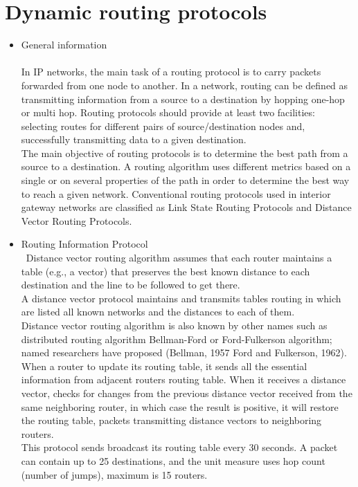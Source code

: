\documentclass[conference,compsoc]{IEEEtran}
\begin{document}
\section{Dynamic routing protocols}
\begin{itemize}
\item 
General information\\\\
In IP networks, the main task of a routing protocol is to carry packets forwarded from one node to another. In a network, routing can be defined as transmitting information from a source to a destination by hopping one-hop or multi hop. Routing protocols should provide at least two facilities: selecting routes for different pairs of source/destination nodes and, successfully transmitting data to a given destination.
\\ The main objective of routing protocols is to determine the best path from a source to a destination. A routing algorithm uses different metrics based on a single or on several properties of the path in order to determine the best way to reach a given network. Conventional routing protocols used in interior gateway networks are classified as Link State Routing Protocols and Distance Vector Routing Protocols.

\item
Routing Information Protocol\\\
Distance vector routing algorithm assumes that each router maintains a table (e.g., a vector) that preserves the best known distance to each destination and the line to be followed to get there.
\\ A distance vector protocol maintains and transmits tables routing in which are listed all known networks and the distances to each of them.
\\ Distance vector routing algorithm is also known by other names such as distributed routing algorithm Bellman-Ford or Ford-Fulkerson algorithm; named researchers have proposed (Bellman, 1957 Ford and Fulkerson, 1962). When a router to update its routing table, it sends all the essential information from adjacent routers routing table. When it receives a distance vector, checks for changes from the previous distance vector received from the same neighboring router, in which case the result is positive, it will restore the routing table, packets transmitting distance vectors to neighboring routers.
\\ This protocol sends broadcast its routing table every 30 seconds. A packet can contain up to 25 destinations, and the unit measure uses hop count (number of jumps), maximum is 15 routers.


\end{itemize}
\end{document}
